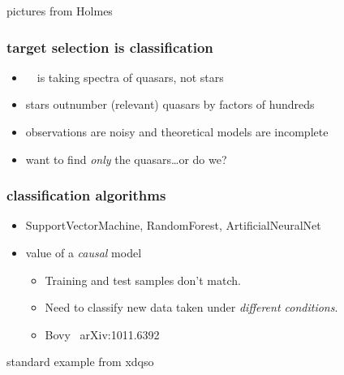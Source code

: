 \documentclass[pdftex]{beamer}
\begin{document}
\begin{frame}
pictures from Holmes
\end{frame}

\begin{frame}
  \frametitle{target selection is classification}
  \begin{itemize}
  \item \sdssiii\ \boss\ is taking spectra of quasars, not stars
  \item stars outnumber (relevant) quasars by factors of hundreds
  \item observations are noisy and theoretical models are incomplete
  \item want to find \emph{only} the quasars\ldots or do we?
  \end{itemize}
\end{frame}

\begin{frame}
  \frametitle{classification algorithms}
  \begin{itemize}
  \item SupportVectorMachine, RandomForest, ArtificialNeuralNet
  \item value of a \emph{causal} model
    \begin{itemize}
    \item Training and test samples don't match.
    \item Need to classify new data taken under \emph{different conditions}.
    \item Bovy \etal\ arXiv:1011.6392
    \end{itemize}
  \end{itemize}
\end{frame}

\begin{frame}
standard example from xdqso
\end{frame}
\end{document}
